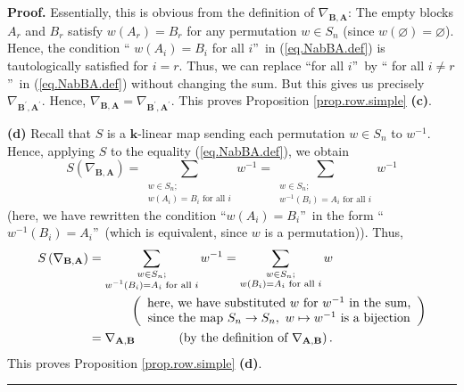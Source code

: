 \documentclass[numbers=enddot,12pt,final,onecolumn,notitlepage]{scrartcl}%
\numberwithin{exer}{subsection}
\theoremstyle{definition}
\newenvironment{proof}[1][Proof]{\noindent\textbf{#1.} }{\ \rule{0.5em}{0.5em}}
\let\sumnonlimits\sum
\renewcommand{\sum}{\sumnonlimits\limits}
\begin{document}
\begin{proof}
Essentially, this is obvious from the definition of $\nabla_{\mathbf{B}%
,\mathbf{A}}$: The empty blocks $A_{r}$ and $B_{r}$ satisfy $w\left(
A_{r}\right)  =B_{r}$ for any permutation $w\in S_{n}$ (since $w\left(
\varnothing\right)  =\varnothing$). Hence, the condition \textquotedblleft%
$w\left(  A_{i}\right)  =B_{i}$ for all $i$\textquotedblright\ in
(\ref{eq.NabBA.def}) is tautologically satisfied for $i=r$. Thus, we can
replace \textquotedblleft for all $i$\textquotedblright\ by \textquotedblleft
for all $i\neq r$\textquotedblright\ in (\ref{eq.NabBA.def}) without changing
the sum. But this gives us precisely $\nabla_{\mathbf{B}^{\prime}%
,\mathbf{A}^{\prime}}$. Hence, $\nabla_{\mathbf{B},\mathbf{A}}=\nabla
_{\mathbf{B}^{\prime},\mathbf{A}^{\prime}}$. This proves Proposition
\ref{prop.row.simple} \textbf{(c)}. \medskip

\textbf{(d)} Recall that $S$ is a $\mathbf{k}$-linear map sending each
permutation $w\in S_{n}$ to $w^{-1}$. Hence, applying $S$ to the equality
(\ref{eq.NabBA.def}), we obtain%
\[
S\left(  \nabla_{\mathbf{B},\mathbf{A}}\right)  =\sum_{\substack{w\in
S_{n};\\w\left(  A_{i}\right)  =B_{i}\text{ for all }i}}w^{-1}=\sum
_{\substack{w\in S_{n};\\w^{-1}\left(  B_{i}\right)  =A_{i}\text{ for all }%
i}}w^{-1}%
\]
(here, we have rewritten the condition \textquotedblleft$w\left(
A_{i}\right)  =B_{i}$\textquotedblright\ in the form \textquotedblleft%
$w^{-1}\left(  B_{i}\right)  =A_{i}$\textquotedblright\ (which is equivalent,
since $w$ is a permutation)). Thus,
\begin{align*}
S\left(  \nabla_{\mathbf{B},\mathbf{A}}\right)   &  =\sum_{\substack{w\in
S_{n};\\w^{-1}\left(  B_{i}\right)  =A_{i}\text{ for all }i}}w^{-1}%
=\sum_{\substack{w\in S_{n};\\w\left(  B_{i}\right)  =A_{i}\text{ for all }%
i}}w\\
&  \ \ \ \ \ \ \ \ \ \ \left(
\begin{array}
[c]{c}%
\text{here, we have substituted }w\text{ for }w^{-1}\text{ in the sum,}\\
\text{since the map }S_{n}\rightarrow S_{n},\ w\mapsto w^{-1}\text{ is a
bijection}%
\end{array}
\right) \\
&  =\nabla_{\mathbf{A},\mathbf{B}}\ \ \ \ \ \ \ \ \ \ \left(  \text{by the
definition of }\nabla_{\mathbf{A},\mathbf{B}}\right)  .
\end{align*}
This proves Proposition \ref{prop.row.simple} \textbf{(d)}.
\end{proof}
\end{document}
